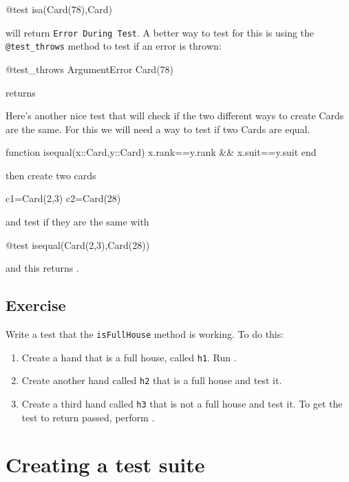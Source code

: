 \begin{jlverbatim}
@test isa(Card(78),Card)
\end{jlverbatim}
%
will return \verb!Error During Test!. A better way to test for this is using the \verb!@test_throws! method to test if an error is thrown:
%
\begin{jlblock}[modules]
@test_throws ArgumentError Card(78)
\end{jlblock}
%
returns  
\printpythontex[verbatim]

Here's another nice test that will check if the two different ways to
create Cards are the same. For this we will need a way to test if two
Cards are equal.

\begin{jlblock}[modules]
function isequal(x::Card,y::Card)
  x.rank==y.rank && x.suit==y.suit
end
\end{jlblock}
%
then create two cards
%
\begin{jlblock}[modules]
c1=Card(2,3)
c2=Card(28)
\end{jlblock}
%
and test if they are the same with
%
\begin{jlblock}[modules]
@test isequal(Card(2,3),Card(28))
\end{jlblock}
%
and this returns  \printpythontex[verb]. 

\subsection{Exercise}

Write a test that the \texttt{isFullHouse} method is working. To do this:
%
\begin{enumerate}
\item  Create a hand that is a full house, called \texttt{h1}. Run . 
\item  Create another hand called \verb!h2! that is a full house and test it.
\item  Create a third hand called \verb!h3! that is not a full house and test it. To get the
  test to return passed, perform . 
\end{enumerate}


\section{Creating a test suite}

